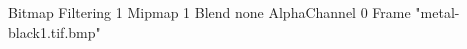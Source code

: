 {Bitmap
	{Filtering 1}
	{Mipmap 1}
	{Blend none}
	{AlphaChannel 0}
	{Frame "metal-black1.tif.bmp"}
}
